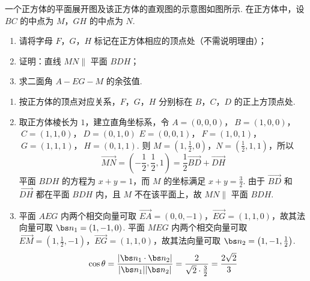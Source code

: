 \begin{problem}
一个正方体的平面展开图及该正方体的直观图的示意图如图所示. 在正方体中，设 \(BC\) 的中点为 \(M\)，\(GH\) 的中点为 \(N\).
\begin{enumerate}
\item 请将字母 \(F\)，\(G\)，\(H\) 标记在正方体相应的顶点处（不需说明理由）；
\item 证明：直线 \(MN\parallel\) 平面 \(BDH\)；
\item 求二面角 \(A - EG - M\) 的余弦值.
\end{enumerate}
\begin{solution}
\begin{enumerate}
\item 按正方体的顶点对应关系，\(F\)，\(G\)，\(H\) 分别标在 \(B\)，\(C\)，\(D\) 的正上方顶点处.
\item 取正方体棱长为 \(1\)，建立直角坐标系，令
\(A=(0,0,0)\)，\(\ B=(1,0,0)\)，\(\ C=(1,1,0)\)，\(\ D=(0,1,0)\)
\(E=(0,0,1)\)，\(\ F=(1,0,1)\)，\(\ G=(1,1,1)\)，\(\ H=(0,1,1)\).
则 \(M=\left(1,\frac12,0\right)\)，\(N=\left(\frac12,1,1\right)\)，所以
\[
\overrightarrow{MN}=\left(-\frac12,\frac12,1\right)=\frac12\overrightarrow{BD}+\overrightarrow{DH}
\]
平面 \(BDH\) 的方程为 \(x+y=1\)，而 \(M\) 的坐标满足 \(x+y=\frac32\). 由于 \(\overrightarrow{BD}\) 和 \(\overrightarrow{DH}\) 都在平面 \(BDH\) 内，且 \(M\) 不在该平面上，故 \(MN\parallel\) 平面 \(BDH\).
\item 平面 \(AEG\) 内两个相交向量可取 \(\overrightarrow{EA}=(0,0,-1)\)，\(\overrightarrow{EG}=(1,1,0)\)，故其法向量可取 \(\bs n_1=(1,-1,0)\). 平面 \(MEG\) 内两个相交向量可取 \(\overrightarrow{EM}=\left(1,\frac12,-1\right)\)，\(\overrightarrow{EG}=(1,1,0)\)，故其法向量可取 \(\bs n_2=\left(1,-1,\frac12\right)\).
\[
\cos\theta=\frac{\lvert\bs n_1\cdot\bs n_2\rvert}{\lvert\bs n_1\rvert\lvert\bs n_2\rvert}
=\frac{2}{\sqrt2\cdot\frac32}=\frac{2\sqrt2}{3}
\]
\end{enumerate}
\end{solution}
\end{problem}

